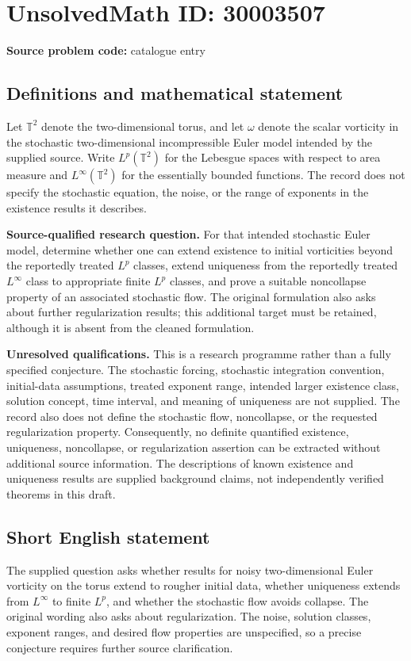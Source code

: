 \documentclass[11pt]{article}
\begin{document}
\section*{UnsolvedMath ID: 30003507}
\textbf{Source problem code:} catalogue entry
\subsection{Definitions and mathematical statement}
Let \(\mathbb T^2\) denote the two-dimensional torus, and let \(\omega\) denote the scalar vorticity in the stochastic two-dimensional incompressible Euler model intended by the supplied source. Write \(L^p(\mathbb T^2)\) for the Lebesgue spaces with respect to area measure and \(L^\infty(\mathbb T^2)\) for the essentially bounded functions. The record does not specify the stochastic equation, the noise, or the range of exponents in the existence results it describes.

\textbf{Source-qualified research question.} For that intended stochastic Euler model, determine whether one can extend existence to initial vorticities beyond the reportedly treated \(L^p\) classes, extend uniqueness from the reportedly treated \(L^\infty\) class to appropriate finite \(L^p\) classes, and prove a suitable noncollapse property of an associated stochastic flow. The original formulation also asks about further regularization results; this additional target must be retained, although it is absent from the cleaned formulation.

\textbf{Unresolved qualifications.} This is a research programme rather than a fully specified conjecture. The stochastic forcing, stochastic integration convention, initial-data assumptions, treated exponent range, intended larger existence class, solution concept, time interval, and meaning of uniqueness are not supplied. The record also does not define the stochastic flow, noncollapse, or the requested regularization property. Consequently, no definite quantified existence, uniqueness, noncollapse, or regularization assertion can be extracted without additional source information. The descriptions of known existence and uniqueness results are supplied background claims, not independently verified theorems in this draft.
\subsection{Short English statement}
The supplied question asks whether results for noisy two-dimensional Euler vorticity on the torus extend to rougher initial data, whether uniqueness extends from \(L^\infty\) to finite \(L^p\), and whether the stochastic flow avoids collapse. The original wording also asks about regularization. The noise, solution classes, exponent ranges, and desired flow properties are unspecified, so a precise conjecture requires further source clarification.
\end{document}
